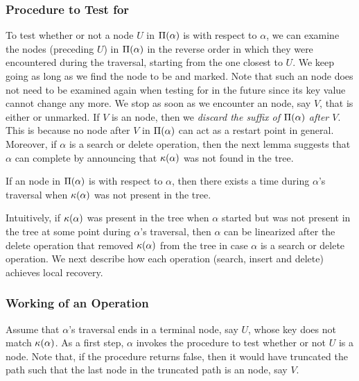 \subsubsection{Procedure to Test for \MySafety{}}
\label{sec:test|safety}
To test whether or not a node $U$ in $\Pi(\alpha)$ is \mysafe{} with respect to $\alpha$,  we can examine the \myanchor{} nodes (preceding $U$) in 
$\Pi(\alpha)$ in the reverse order in which they were encountered during the traversal, starting from the one closest to $U$. We keep going as long as we find the \myanchor{} node to be \myconsistent{} and marked. Note that such an \myanchor{} node does not need to be examined again when testing for \mysafety{} in the future since its key value cannot change any more. We stop as soon as we encounter an \myanchor{} node, say $V$, that is either \mynonconsistent{} or unmarked.
If $V$ is an \mynonconsistent{} \myanchor{} node, then we \emph{discard the suffix of $\Pi(\alpha)$ after $V$}. This is because no node after $V$ in $\Pi(\alpha)$ can act as a restart point in general.
Moreover, if $\alpha$ is a search or delete operation,  then the next lemma suggests that $\alpha$ 
can complete by announcing that $\kappa(\alpha)$ was not found in the tree. 

\begin{lemma}
\label{lem:inconsistent:not|present}
If an \myanchor{} node in $\Pi(\alpha)$ is \myinconsistent{} with respect to $\alpha$, 
then there exists a time during $\alpha$'s traversal when $\kappa(\alpha)$ was not present in the tree.
\end{lemma}

Intuitively, if $\kappa(\alpha)$ was present in the tree when $\alpha$ started but was not present in the tree at some point during $\alpha$'s traversal, 
then $\alpha$ can be linearized after the delete operation that removed $\kappa(\alpha)$ from the tree in case $\alpha$ is a search or delete operation.
We next describe how each operation (search, insert and delete) achieves local recovery.

\subsubsection{Working of an Operation}

Assume that $\alpha$'s traversal ends in a terminal node, say $U$, whose key does not match $\kappa(\alpha)$.  As a first step, $\alpha$ invokes the procedure to test whether or not $U$ is a \mysafe{} node. Note that, if the procedure returns false, then it would have truncated the path such that the last node in the truncated path is an \mynonconsistent{} node, say $V$.


